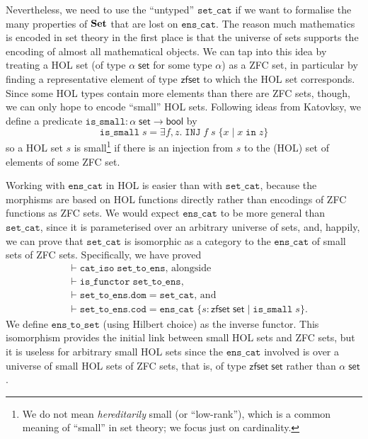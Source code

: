 \documentclass[twoside,titlepage,11pt]{article}
\begin{document}
Nevertheless, we need to use the ``untyped'' $\mathtt{set\_cat}$ if we want to formalise the many properties of $\mathbf{Set}$ that are lost on $\mathtt{ens\_cat}$.
The reason much mathematics is encoded in set theory in the first place is that the universe of sets supports the encoding of almost all mathematical objects.
We can tap into this idea by treating a HOL set (of type $\alpha\;\mathsf{set}$ for some type $\alpha$) as a ZFC set, in particular by finding a representative element of type $\mathsf{zfset}$ to which the HOL set corresponds.
Since some HOL types contain more elements than there are ZFC sets, though, we can only hope to encode ``small'' HOL sets.
Following ideas from Katovksy, we define a predicate $\mathtt{is\_small}:\alpha\;\mathsf{set}\to\mathsf{bool}$ by $$\mathtt{is\_small}\;s=\exists{f,z}.\;\mathtt{INJ}\;f\;s\;\{x\mid x\operatorname{\mathtt{in}} z\}$$ so a HOL set $s$ is small\footnote{We do not mean \emph{hereditarily} small (or ``low-rank''), which is a common meaning of ``small'' in set theory; we focus just on cardinality.} if there is an injection from $s$ to the (HOL) set of elements of some ZFC set.

Working with $\mathtt{ens\_cat}$ in HOL is easier than with $\mathtt{set\_cat}$, because the morphisms are based on HOL functions directly rather than encodings of ZFC functions as ZFC sets.
We would expect $\mathtt{ens\_cat}$ to be more general than $\mathtt{set\_cat}$, since it is parameterised over an arbitrary universe of sets, and, happily, we can prove that $\mathtt{set\_cat}$ is isomorphic as a category to the $\mathtt{ens\_cat}$ of small sets of ZFC sets.
Specifically, we have proved
\begin{align*}
&\vdash\mathtt{cat\_iso}\;\mathtt{set\_to\_ens}\text{, alongside}\\
&\vdash\mathtt{is\_functor}\;\mathtt{set\_to\_ens}\text{,}\\
&\vdash\mathtt{set\_to\_ens}.\mathtt{dom}=\mathtt{set\_cat}\text{, and}\\
&\vdash\mathtt{set\_to\_ens}.\mathtt{cod}=\mathtt{ens\_cat}\;\{s:\mathsf{zfset}\;\mathsf{set}\mid\mathtt{is\_small}\;s\}\text{.}
\end{align*}
We define $\mathtt{ens\_to\_set}$ (using Hilbert choice) as the inverse functor.
This isomorphism provides the initial link between small HOL sets and ZFC sets, but it is useless for arbitrary small HOL sets since the $\mathtt{ens\_cat}$ involved is over a universe of small HOL sets of ZFC sets, that is, of type $\mathsf{zfset}\;\mathsf{set}$ rather than $\alpha\;\mathsf{set}$.
\end{document}
